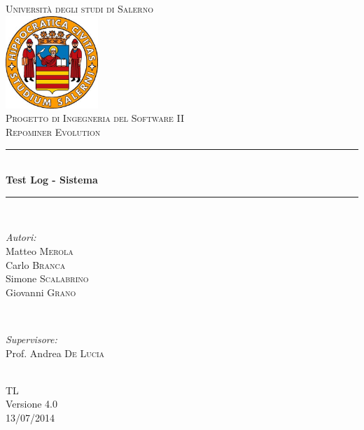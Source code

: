 \documentclass[a4paper, 12pt, italian]{report}
\begin{document}
\begin{titlepage}
\newcommand{\HRule}{\rule{\linewidth}{0.5mm}} 
\center 
\textsc{\LARGE Università degli studi di Salerno}\\[1cm] 
\includegraphics[width=3.5cm]{img/logo.jpg} \\[1cm]
\textsc{\large Progetto di Ingegneria del Software II}\\[0.5cm]
\textsc{\Large Repominer Evolution}\\[0.5cm] 
 \HRule \\[0.4cm]
{ \large \bfseries Test Log - Sistema}\\[0.4cm] 
\HRule \\[1.5cm]

\begin{minipage}{0.4\textwidth}
\begin{flushleft} \large
\emph{Autori:}\\
Matteo \textsc{Merola}\\
Carlo \textsc{Branca}\\
Simone \textsc{Scalabrino}\\
Giovanni \textsc{Grano}\\
\end{flushleft}
\end{minipage}
~
\begin{minipage}{0.4\textwidth}
\begin{flushright} \large
\emph{Supervisore:} \\
Prof. Andrea \textsc{De Lucia}
\end{flushright}
\end{minipage}\\[2.5cm]

{\Large TL}\\
Versione 4.0\\[1cm]

{\large 13/07/2014} %

\vfill

\end{titlepage}		
    
	\setcounter{tocdepth}{1}	
	\tableofcontents
	
	
	
	
	
\end{document}
